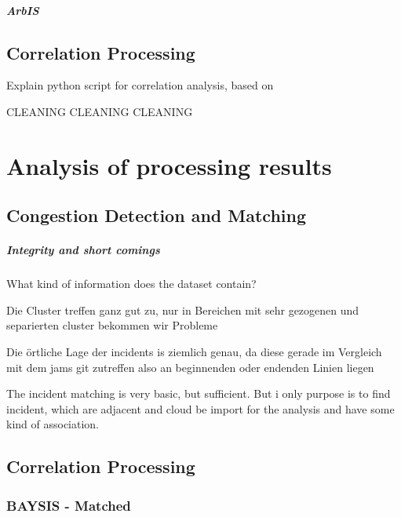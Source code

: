 \documentclass[a4paper,headsepline,footsepline,fontsize=11pt,BCOR=12mm,DIV=12]{report}
\begin{document}
\paragraph{ArbIS}

 
\section{Correlation Processing}
\label{definition_correlation_processing}

Explain python script for correlation analysis, based on \cite{Potvin2020}

CLEANING CLEANING CLEANING







\chapter{Analysis of processing results}

\section{Congestion Detection and Matching}

\paragraph{Integrity and short comings}

What kind of information does the dataset contain?

Die Cluster treffen ganz gut zu, nur in Bereichen mit sehr gezogenen und separierten cluster bekommen wir Probleme

Die örtliche Lage der incidents is ziemlich genau, da diese gerade im Vergleich mit dem jams git zutreffen also an beginnenden oder endenden Linien liegen

The incident matching is very basic, but sufficient. But i only purpose is to find incident, which are adjacent and cloud be import for the analysis and have some kind of association.

\section{Correlation Processing}

\subsection{BAYSIS - Matched}
\end{document}
